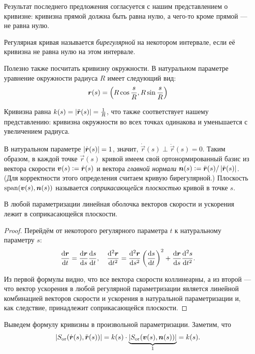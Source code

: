 Результат последнего предложения согласуется с нашим представлением о кривизне: кривизна прямой должна быть равна нулю, а чего-то кроме прямой --- не равна нулю.

\begin{definition}
	Регулярная кривая называется \textit{бирегулярной} на некотором интервале, если её кривизна не равна нулю на этом интервале.
\end{definition}

Полезно также посчитать кривизну окружности. В натуральном параметре уравнение окружности радиуса $R$ имеет следующий вид:
\[
	\vec{r}(s) = \br{R\cos\frac{s}{R}, R\sin\frac{s}{R}}
\]

Кривизна равна $k(s) = \abs{\ddot{\vec{r}}(s)} = \frac{1}{R}$, что также соответствует нашему представлению: кривизна окружности во всех точках одинакова и уменьшается с увеличением радиуса.

В натуральном параметре $\abs{\dot{\vec{r}}(s)} = 1$, значит, $\dot{\vec{r}}(s) \perp \ddot{\vec{r}}(s) = 0$. Таким образом, в каждой точке $\vec{r}(s)$ кривой имеем свой ортонормированный базис из вектора скорости $\vec{v}(s) \vcentcolon = \dot{\vec{r}}(s)$ и вектора \textit{главной нормали} $\vec{n}(s) \vcentcolon = \ddot{\vec{r}}(s) / \abs{\ddot{\vec{r}}(s)}$. (Для корректности этого определения считаем кривую бирегулярной.) Плоскость $\span(\vec{v}(s), \vec{n}(s))$ называется \textit{соприкасающейся плоскостью} кривой в точке $s$.

\begin{proposition} \label{proposition:TouchPlane}
	В любой параметризации линейная оболочка векторов скорости и ускорения лежит в соприкасающейся плоскости.
\end{proposition}

\begin{proof}
	Перейдём от некоторого регулярного параметра $t$ к натуральному параметру $s$:
	\[
		\frac{\d\vec{r}}{\d t} = \frac{\d\vec{r}}{\d s} \frac{\d s}{\d t},\quad \frac{\d^2\vec{r}}{\d t^2} = \frac{\d^2\vec{r}}{\d s^2}\br{\frac{\d s}{\d t}}^2 + \frac{\d\vec{r}}{\d s}\frac{\d^2s}{\d t^2}.
	\]

	Из первой формулы видно, что все вектора скорости коллинеарны, а из второй --- что вектор ускорения в любой регулярной параметризации является линейной комбинацией векторов скорости и ускорения в натуральной параметризации и, как следствие, принадлежит соприкасающейся плоскости.
\end{proof}

Выведем формулу кривизны в произвольной параметризации. Заметим, что
\[
	\abs{S_{\Or}(\dot{\vec{r}}(s), \ddot{\vec{r}}(s))} = k(s) \cdot \underbrace{\abs{S_{\Or}(\vec{v}(s), \vec{n}(s))}}_1 = k(s).
\]

